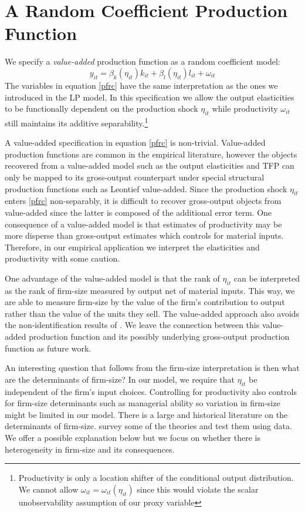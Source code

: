\documentclass[11pt]{article}
\begin{document}
\section{A Random Coefficient Production Function} \label{ourmodel}
We specify a \textit{value-added} production function as a random coefficient model:
\begin{equation} \label{pfrc}
    y_{it}=\beta_{k}(\eta_{it})k_{it}+\beta_{l}(\eta_{it})l_{it}+\omega_{it}
\end{equation}
The variables in equation \eqref{pfrc} have the same interpretation as the ones we introduced in the LP model. In this specification we allow the output elasticities to be functionally dependent on the production shock $\eta_{it}$ while productivity $\omega_{it}$ still maintains its additive separability.\footnote{Productivity is only a location shifter of the conditional output distribution. We cannot allow $\omega_{it}=\omega_{it}(\eta_{it})$ since this would violate the scalar unobservability assumption of our proxy variable}

A value-added specification in equation \eqref{pfrc} is non-trivial. Value-added production functions are common in the empirical literature, however the objects recovered from a value-added model such as the output elasticities and TFP can only be mapped to its gross-output counterpart under special structural production functions such as Leontief value-added. Since the production shock $\eta_{it}$ enters \eqref{pfrc} non-separably, it is difficult to recover gross-output objects from value-added since the latter is composed of the additional error term. One consequence of a value-added model is that estimates of productivity may be more disperse than gross-output estimates which controls for material inputs. Therefore, in our empirical application we interpret the elasticities and productivity with some caution.

 One advantage of the value-added model is that the rank of $\eta_{it}$ can be interpreted as the rank of firm-size measured by output net of material inputs. This way, we are able to measure firm-size by the value of the firm's contribution to output rather than the value of the units they sell. The value-added approach also avoids the non-identification results of \cite{Gandhi2020}. We leave the connection between this value-added production function and its possibly underlying gross-output production function as future work.

 An interesting question that follows from the firm-size interpretation is then what are the determinants of firm-size? In our model, we require that $\eta_{it}$ be independent of the firm's input choices. Controlling for productivity also controls for firm-size determinants such as managerial ability so variation in firm-size might be limited in our model. There is a large and historical literature on the determinants of firm-size. \cite{Kumar1999} survey some of the theories and test them using data. We offer a possible explanation below but we focus on whether there is heterogeneity in firm-size and its consequences. 
\end{document}

